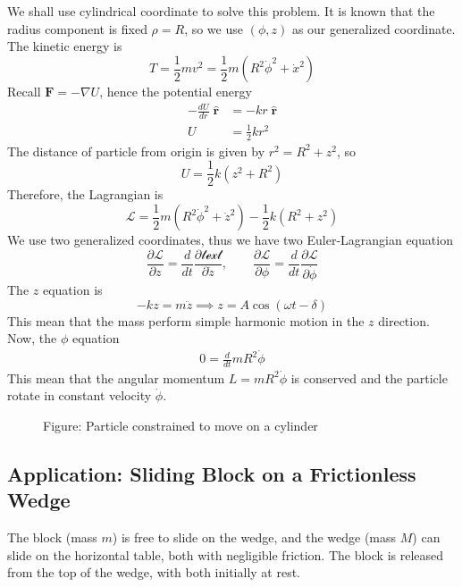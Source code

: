 \documentclass[../../../main.tex]{subfiles}
\begin{document}
We shall use cylindrical coordinate to solve this problem.
It is known that the radius component is fixed $\rho=R$, so we use $(\phi, z)$ as our generalized coordinate.
The kinetic energy is
\begin{equation*}
	T=\frac{1}{2}mv^2=\frac{1}{2}m(R^2\dot{\phi}^2+\dot{x}^2)
\end{equation*}
Recall $\mathbf{F}=-\nabla U$, hence the potential energy
\begin{align*}
	-\frac{dU}{dr}\;\mathbf{\hat{r}} & =-kr\;\mathbf{\hat{r}} \\
	U                                & =\frac{1}{2}kr^2
\end{align*}
The distance of particle from origin is given by $r^2=R^2+z^2$, so
\begin{equation*}
	U=\frac{1}{2}k(z^2+R^2)
\end{equation*}
Therefore, the Lagrangian is
\begin{equation*}
	\mathcal{L}=\frac{1}{2}m(R^2\dot{\phi}^2+\dot{z}^2)-\frac{1}{2}k(R^2+z^2)
\end{equation*}
We use two generalized coordinates, thus we have two Euler-Lagrangian equation
\begin{equation*}
	\frac{\partial \mathcal{L}}{\partial z}=\frac{d}{dt}\frac{\partial \mathcal{text}}{\partial \dot{z}},\qquad\frac{\partial\mathcal{L}}{\partial \phi}=\frac{d}{dt}\frac{\partial\mathcal{L}}{\partial \dot{\phi}}
\end{equation*}
The $z$ equation is
\begin{equation*}
	-kz=m\ddot{z}\implies z=A\cos(\omega t-\delta)
\end{equation*}
This mean that the mass perform simple harmonic motion in the $z$ direction.
Now, the $\phi$ equation
\begin{align*}
	0=\frac{d}{dt}mR^2\dot{\phi}
\end{align*}
This mean that the angular momentum $L=mR^2\dot{\phi}$ is conserved and the particle rotate in constant velocity $\dot{\phi}$.

\begin{figure*}
	\centering
	\caption*{Figure: Particle constrained to move on a cylinder}
\end{figure*}

\subsection{Application: Sliding Block on a Frictionless Wedge}
The block (mass $m$) is free to slide on the wedge, and the wedge (mass $M$) can slide on the horizontal table, both with negligible friction.
The block is released from the top of the wedge, with both initially at rest.
\end{document}
